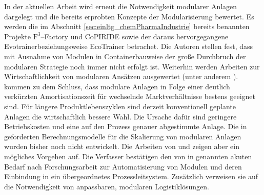 In der aktuellen Arbeit  \cite{Lier_2016a} wird erneut die Notwendigkeit modularer Anlagen dargelegt und die bereits erprobten Konzepte der Modularisierung bewertet. Es werden die im Abschnitt \ref{sec:einltg_chemPharmaIndustrie} bereits benannten Projekte $\text{F}^{3}$--Factory \cite{f3_2014} und CoPIRIDE \cite{copiride_2014} sowie der daraus hervorgegangene \glqq Evotrainer\grqq { }beziehungsweise \glqq EcoTrainer\grqq { }\cite{Lang_2012} betrachet. Die Autoren stellen fest, dass mit Ausnahme von Modulen in Containerbauweise der gro\ss{}e Durchbruch der modularen Strategie noch immer nicht erfolgt ist. Weiterhin werden Arbeiten zur Wirtschaftlichkeit von modularen Ans\"atzen ausgewertet (unter anderem \cite{Seifert_2012, Brodhagen_2012}). \citeauthor{Lier_2016a} kommen zu dem Schluss, dass modulare Anlagen in Folge einer deutlich verk\"urzten Amortisationszeit f\"ur wechselnde Marktverh\"altnisse bestens geeignet sind. F\"ur l\"angere Produktlebenszyklen sind derzeit konventionell geplante Anlagen die wirtschaftlich bessere Wahl. Die Ursache daf\"ur sind geringere Betriebskosten und eine auf den Prozess genauer abgestimmte Anlage. Die in \cite{Bramsiepe_2012} geforderten Berechnungsmodelle f\"ur die Skalierung von modularen Anlagen wurden bisher noch nicht entwickelt. Die Arbeiten von \citeauthor{Brodhagen_2012} \cite{Brodhagen_2012} und \citeauthor{Grundemann_2012} \cite{Grundemann_2012} zeigen aber ein m\"ogliches Vorgehen auf. Die Verfasser best\"atigen den von \citeauthor{Urbas_2012} in \cite{Urbas_2012} genannten akuten Bedarf nach Forschungsarbeit zur Automatisierung von Modulen und deren Einbindung in ein \"ubergeordnetes Prozessleitsystem. Zus\"atzlich verweisen sie auf die Notwendigkeit von anpassbaren, modularen Logistikl\"osungen. 

